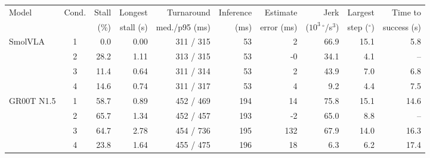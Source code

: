 \begin{tabular}{l c rrrrrrrr}
\toprule
Model & Cond. & Stall & Longest & Turnaround & Inference & Estimate & Jerk & Largest & Time to \\
 & & (\%) & stall (s) & med./p95 (ms) & (ms) & error (ms) & ($10^3\,^\circ$/s$^3$) & step ($^\circ$) & success (s) \\
\midrule
SmolVLA & 1 & 0.0 & 0.00 & 311 / 315 & 53 & 2 & 66.9 & 15.1 & 5.8 \\
 & 2 & 28.2 & 1.11 & 313 / 315 & 53 & -0 & 34.1 & 4.1 & -- \\
 & 3 & 11.4 & 0.64 & 311 / 314 & 53 & 2 & 43.9 & 7.0 & 6.8 \\
 & 4 & 14.6 & 0.74 & 311 / 317 & 53 & 4 & 9.2 & 4.4 & 7.5 \\
\addlinespace
GR00T N1.5 & 1 & 58.7 & 0.89 & 452 / 469 & 194 & 14 & 75.8 & 15.1 & 14.6 \\
 & 2 & 65.7 & 1.34 & 452 / 457 & 193 & -2 & 65.0 & 8.8 & -- \\
 & 3 & 64.7 & 2.78 & 454 / 736 & 195 & 132 & 67.9 & 14.0 & 16.3 \\
 & 4 & 23.8 & 1.64 & 455 / 475 & 196 & 18 & 6.3 & 6.2 & 17.4 \\
\bottomrule
\end{tabular}
